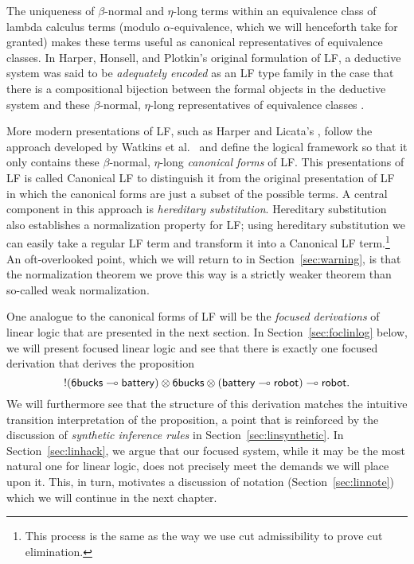 The uniqueness of $\beta$-normal and $\eta$-long terms within an
equivalence class of lambda calculus terms (modulo
$\alpha$-equivalence, which we will henceforth take for granted) makes
these terms useful as canonical representatives of equivalence
classes. In Harper, Honsell, and Plotkin's original formulation
of LF, a deductive system was said to be {\it adequately encoded} as
an LF type family in the case that there is a compositional bijection
between the formal objects in the deductive system and these
$\beta$-normal, $\eta$-long representatives of equivalence classes
\cite{harper93framework}.

More modern presentations of LF, such as Harper and Licata's
\cite{harper07mechanizing}, follow the approach developed by Watkins
et al.~\cite{watkins02concurrent} and define the logical framework so
that it only contains these $\beta$-normal, $\eta$-long {\it canonical
  forms} of LF. This presentations of LF is called Canonical LF to
distinguish it from the original presentation of LF in which the
canonical forms are just a subset of the possible terms. A central
component in this approach is {\it hereditary substitution}.
Hereditary substitution also establishes a normalization property for
LF; using hereditary substitution we can easily take a regular LF
term and transform it into a Canonical LF term.\footnote{This process
  is the same as the way we use cut admissibility to prove cut
  elimination.} An oft-overlooked point, which we will return to in
Section~\ref{sec:warning}, is that the normalization theorem we prove
this way is a strictly weaker theorem than so-called weak
normalization.

One analogue to the canonical forms of LF will be the {\it focused
  derivations} of linear logic that are presented in the next
section. In Section~\ref{sec:foclinlog} below, we will present 
focused linear logic and see that there is exactly 
one focused derivation that derives the proposition
\[{!}({\sf 6bucks} \multimap {\sf battery}) \otimes {\sf 6bucks} \otimes
({\sf battery} \multimap {\sf robot}) \multimap {\sf robot}.\] 
%
We will furthermore see that the structure of this derivation matches
the intuitive transition interpretation of the proposition, a point
that is reinforced by the discussion of {\it synthetic inference
  rules} in Section~\ref{sec:linsynthetic}. In
Section~\ref{sec:linhack}, we argue that our focused system, while it
may be the most natural one for linear logic, does not precisely meet
the demands we will place upon it. This, in turn, motivates a
discussion of notation (Section~\ref{sec:linnote}) 
which we will continue in the next chapter.

